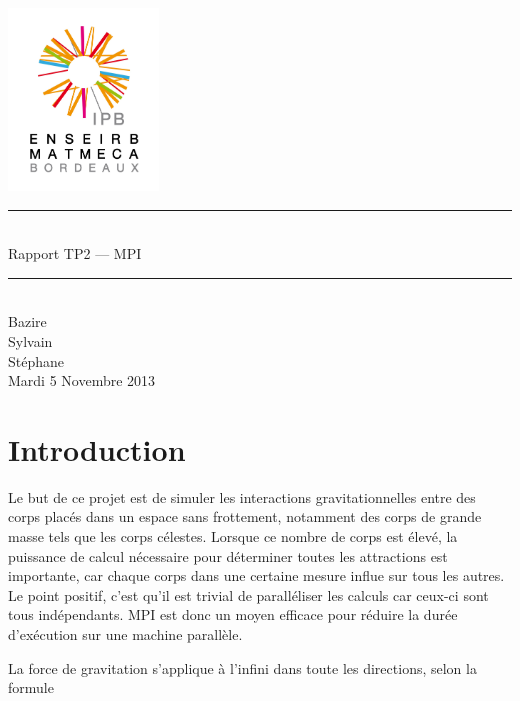 \documentclass[a4paper,11pt]{article}
\begin{document}
\begin{titlepage}
  \begin{center}

    \begin{center}
      \includegraphics[width=4cm]{EM.jpg}
    \end{center}

    \vspace*{1cm}
        
    \rule{0.75\linewidth}{0.7mm}\\[0.4cm]
    {\Huge Rapport TP2 --- MPI\\[0.4cm]}
    \rule{0.75\linewidth}{0.7mm} \\[1.5cm]

    {\Large Bazire \\Sylvain {}\\Stéphane \\[2cm]}
    {\Large Mardi 5 Novembre 2013}
  \end{center}
\end{titlepage}

\tableofcontents
\clearpage
\section{Introduction}


Le but de ce projet est de simuler les interactions gravitationnelles entre des corps placés dans un espace sans frottement, notamment des corps de grande masse tels que les corps célestes. Lorsque ce nombre de corps est élevé, la puissance de calcul nécessaire pour déterminer toutes les attractions est importante, car chaque corps dans une certaine mesure influe sur tous les autres. Le point positif, c'est qu'il est trivial de paralléliser les calculs car ceux-ci sont tous indépendants. MPI est donc un moyen efficace pour réduire la durée d'exécution sur une machine parallèle.

La force de gravitation s'applique à l'infini dans toute les directions, selon la formule
\end{document}
